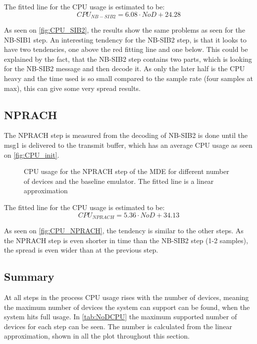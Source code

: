 The fitted line for the CPU usage is estimated to be:
\begin{equation}
CPU_{NB-SIB2} = 6.08 \cdot NoD + 24.28
\end{equation}

As seen on \autoref{fig:CPU_SIB2}, the results show the same problems as seen for the NB-SIB1 step. An interesting tendency for the NB-SIB2 step, is that it looks to have two tendencies, one above the red fitting line and one below. This could be explained by the fact, that the NB-SIB2 step contains two parts, which is looking for the NB-SIB2 message and then decode it. As only the later half is the CPU heavy and the time used is so small compared to the sample rate (four samples at max), this can give some very spread results. 



\subsection{NPRACH}
The NPRACH step is measured from the decoding of NB-SIB2 is done until the msg1 is delivered to the transmit buffer, which has an average CPU usage as seen on \autoref{fig:CPU_init}.

\begin{figure}[H]
\centering
\resizebox{0.5\textwidth}{!}{
}
\caption{CPU usage for the NPRACH step of the MDE for different number of devices and the baseline emulator. The fitted line is a linear approximation}
\label{fig:CPU_NPRACH}
\end{figure}

The fitted line for the CPU usage is estimated to be:
\begin{equation}
CPU_{NPRACH} = 5.36 \cdot NoD + 34.13
\end{equation}

As seen on \autoref{fig:CPU_NPRACH}, the tendency is similar to the other steps. As the NPRACH step is even shorter in time than the NB-SIB2 step (1-2 samples), the spread is even wider than at the previous step.

\subsection{Summary}
At all steps in the process CPU usage rises with the number of devices, meaning the maximum number of devices the system can support can be found, when the system hits full usage. In \autoref{tab:NoDCPU} the maximum supported number of devices for each step can be seen. The number is calculated from the linear approximation, shown in all the plot throughout this section.

